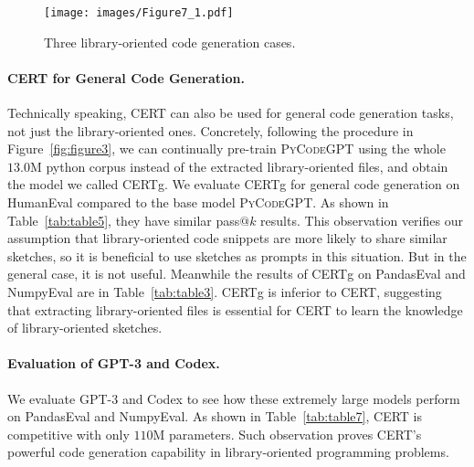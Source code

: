 \documentclass{article}
\newcommand{\cert}{\textsc{CERT}\xspace}
\newcommand{\certg}{\textsc{CERT}g\xspace}
\newcommand{\peval}{PandasEval\xspace}
\newcommand{\neval}{NumpyEval\xspace}
\newcommand{\codepy}{\textsc{PyCodeGPT}\xspace}
\begin{document}
\begin{figure*}[t]
    \small
    \centering
    \texttt{[image: images/Figure7\_1.pdf]}
\caption{Three library-oriented code generation cases.}
    \label{fig:figure6}
\end{figure*}

\paragraph{\cert for General Code Generation.}
Technically speaking, \cert can also be used for general code generation tasks, not just the library-oriented ones. Concretely, following the procedure in Figure~\ref{fig:figure3}, we can continually pre-train \codepy using the whole $13.0$M python corpus instead of the extracted library-oriented files, and obtain the model we called \certg. We evaluate \certg for general code generation on HumanEval compared to the base model \codepy. As shown in Table~\ref{tab:table5}, they have similar pass$@k$ results. This observation verifies our assumption that library-oriented code snippets are more likely to share similar sketches, so it is beneficial to use sketches as prompts in this situation. But in the general case, it is not useful. 
Meanwhile the results of \certg on \peval and \neval are in Table~\ref{tab:table3}. \certg is inferior to \cert, suggesting that extracting library-oriented files is essential for \cert to learn the knowledge of library-oriented sketches.

\paragraph{Evaluation of GPT-3 and Codex.}
We evaluate GPT-3 and Codex to see how these extremely large models perform on \peval and \neval. 
As shown in Table~\ref{tab:table7}, \cert is competitive with only $110$M parameters. Such observation proves \cert's powerful code generation capability in library-oriented programming problems. 
\end{document}
